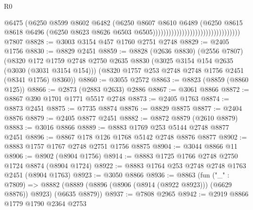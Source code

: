 \begin{lexlean}{R0}
\begin{coremodule}
                                                              @6475
                                                              (@6250
                                                                @8599
                                                                @8602
                                                                @6482
                                                                (@6250
                                                                  @8607
                                                                  @8610
                                                                  @6489
                                                                  (@6250
                                                                    @8615
                                                                    @8618
                                                                    @6496
                                                                    (@6250
                                                                      @8623
                                                                      @8626
                                                                      @6503
                                                                      @6505)))))))))))))))))))))))))))))))))
    @7807
@8828 := @3003 @3154 @457 @1760 @2751 @2748
@8829 := @2405 @1756
@8830 := @8829 @2451
@8859 := @8828
    (@2636 @8830)
    (@2556 @7807)
    (@8320
      @172
      @1759
      @2748
      @2750
      @2635
      @8830
      (@3025 @3154 @154 @2635 (@3030 (@3031 @3154 @154)))
      (@8320 @1757 @253 @2748 @2748 @1756 @2451 (@8341 @1756) @8360))
@8860 := @3055 @2572
@8863 := @8823 (@8859 (@8860 @125))
@8866 := @2873 (@2883 @2633) @2886
@8867 := @3061 @8866
@8872 := @8867 @390 @1701 @1771 @5517 @2748
@8873 := @2405 @1763
@8874 := @8873 @2451
@8875 := @7735 @8874
@8876 := @8829 @8875
@8877 := @2404 @8876
@8879 := @2405 @8877 @2451
@8882 := @8872 @8879 (@2610 @8879)
@8883 := @3016 @8866
@8889 := @8883 @1769 @253 @5144 @2748 @8877 @2451
@8896 := @8867 @178 @126 @1768 @5142 @2748 @8876 @8877
@8902 := @8883 @1757 @1767 @2748 @2751 @1756 @8875
@8904 := @3044 @8866 @11
@8906 := @8902 (@8904 @1756)
@8914 := @8883 @1725 @1766 @2748 @2750 @1724 @8874 (@8904 @1724)
@8922 := @8883 @1764 @253 @2748 @2748 @1763 @2451 (@8904 @1763)
@8923 := @3050 @8866
@8936 := @8863
    (fun ("_" : @7809) =>
    @8882 (@8889 (@8896 (@8906 (@8914 (@8922 @8923))) (@6629 @8876)) @8923) (@6635 @8879))
@8937 := @7808 @2965
@8942 := @2919 @8866 @1779 @1790 @2364 @2753

\end{coremodule}
\end{lexlean}
